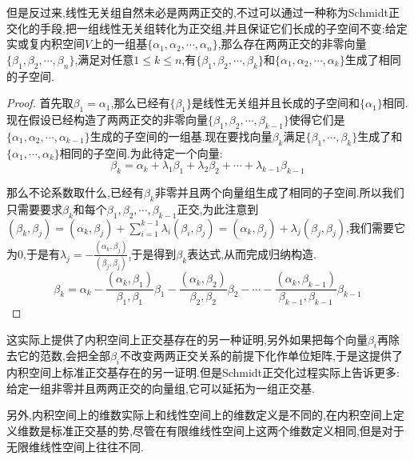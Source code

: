 但是反过来,线性无关组自然未必是两两正交的,不过可以通过一种称为Schmidt正交化的手段,把一组线性无关组转化为正交组,并且保证它们长成的子空间不变:给定实或复内积空间$V$上的一组基$\{\alpha_1,\alpha_2,\cdots,\alpha_n\}$,那么存在两两正交的非零向量$\{\beta_1,\beta_2,\cdots,\beta_n\}$,满足对任意$1\le k\le n$,有$\{\beta_1,\beta_2,\cdots,\beta_k\}$和$\{\alpha_1,\alpha_2,\cdots,\alpha_k\}$生成了相同的子空间.
\begin{proof}
	
	首先取$\beta_1=\alpha_1$,那么已经有$\{\beta_1\}$是线性无关组并且长成的子空间和$\{\alpha_1\}$相同.现在假设已经构造了两两正交的非零向量$\{\beta_1,\beta_2,\cdots,\beta_{k-1}\}$使得它们是$\{\alpha_1,\alpha_2,\cdots,\alpha_{k-1}\}$生成的子空间的一组基.现在要找向量$\beta_k$满足$\{\beta_1,\cdots,\beta_k\}$生成了和$\{\alpha_1,\cdots,\alpha_k\}$相同的子空间.为此待定一个向量:
	$$\beta_k=\alpha_k+\lambda_1\beta_1+\lambda_2\beta_2+\cdots+\lambda_{k-1}\beta_{k-1}$$
	
	那么不论系数取什么,已经有$\beta_k$非零并且两个向量组生成了相同的子空间.所以我们只需要要求$\beta_k$和每个$\beta_1,\beta_2,\cdots,\beta_{k-1}$正交,为此注意到$(\beta_k,\beta_j)=(\alpha_k,\beta_j)+\sum_{i=1}^{k-1}\lambda_i(\beta_i,\beta_j)=(\alpha_k,\beta_j)+\lambda_j(\beta_j,\beta_j)$,我们需要它为0,于是有$\lambda_j=-\frac{(\alpha_k,\beta_j)}{(\beta_j,\beta_j)}$,于是得到$\beta_k$表达式,从而完成归纳构造.
	$$\beta_k=\alpha_k-\frac{(\alpha_k,\beta_1)}{\beta_1,\beta_1}\beta_1-\frac{(\alpha_k,\beta_2)}{\beta_2,\beta_2}\beta_2-\cdots-\frac{(\alpha_k,\beta_{k-1})}{\beta_{k-1},\beta_{k-1}}\beta_{k-1}$$
	
\end{proof}

这实际上提供了内积空间上正交基存在的另一种证明,另外如果把每个向量$\beta_i$再除去它的范数,会把全部$\beta_i$不改变两两正交关系的前提下化作单位矩阵,于是这提供了内积空间上标准正交基存在的另一证明.但是Schmidt正交化过程实际上告诉更多:给定一组非零并且两两正交的向量组,它可以延拓为一组正交基.

另外,内积空间上的维数实际上和线性空间上的维数定义是不同的,在内积空间上定义维数是标准正交基的势,尽管在有限维线性空间上这两个维数定义相同,但是对于无限维线性空间上往往不同.

